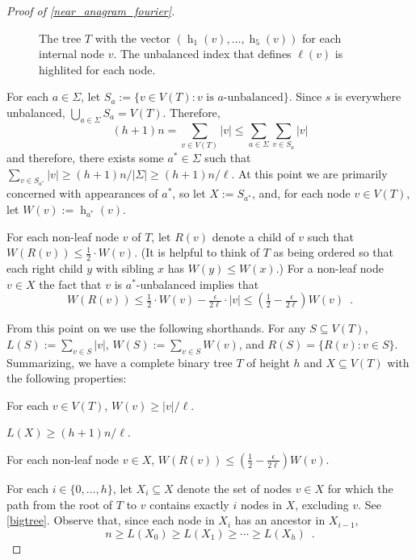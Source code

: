\documentclass{patmorin}
\DeclareMathOperator{\hist}{h}
\begin{document}
\begin{proof}[Proof of \cref{near_anagram_fourier}]
  \begin{figure}
    \caption{The tree $T$ with the vector $(\hist_1(v),\ldots,\hist_5(v))$ for each
     internal node $v$.  The unbalanced index that defines $\ell(v)$ is highlited for each node.}
    \label{binary_tree_2}
  \end{figure}

  For each $a\in\Sigma$, let $S_a:=\{v\in V(T): \text{$v$ is $a$-unbalanced}\}$. Since $s$ is everywhere unbalanced, $\bigcup_{a\in\Sigma} S_a=V(T)$. Therefore,
  \[
     (h+1)n = \sum_{v\in V(T)}|v|\le \sum_{a\in\Sigma} \sum_{v\in S_a} |v|
  \]
  and therefore, there exists some $a^*\in\Sigma$ such that $\sum_{v\in S_{a^*}}|v|\ge (h+1)n/|\Sigma| \ge (h+1)n/\ell$.   At this point we are primarily concerned with appearances of $a^*$, so let $X:=S_{a^*}$, and, for each node $v\in V(T)$, let $W(v):=\hist_{a^*}(v)$.

  For each non-leaf node $v$ of $T$, let $R(v)$ denote a child of $v$ such that $W(R(v))\le \tfrac12\cdot W(v)$.  (It is helpful to think of $T$ as being ordered so that each right child $y$ with sibling $x$ has $W(y)\le W(x)$.)  For a non-leaf node $v\in X$ the fact that $v$ is $a^*$-unbalanced implies that
  \[  W(R(v)) \le \tfrac{1}{2}\cdot W(v) - \tfrac{\epsilon}{2\ell}\cdot |v|
      \le (\tfrac12-\tfrac{\epsilon}{2\ell})W(v) \enspace .
  \]

  From this point on we use the following shorthands. For any $S\subseteq V(T)$, $L(S):=\sum_{v\in S}|v|$, $W(S):=\sum_{v\in S}W(v)$, and $R(S)=\{R(v):v\in S\}$.  Summarizing, we have a complete binary tree $T$ of height $h$ and
  $X\subseteq V(T)$ with the following properties:
  \begin{compactenum}
    \item For each $v\in V(T)$,  $W(v)\ge |v|/\ell$.
    \item $L(X) \ge (h+1)n/\ell$.
    \item For each non-leaf node $v\in X$,
      $W(R(v)) \le (\tfrac{1}{2}-\tfrac{\epsilon}{2\ell})W(v)$.
  \end{compactenum}
  For each $i\in\{0,\ldots,h\}$, let $X_i\subseteq X$ denote the
  set of nodes $v\in X$ for which the path from the root of $T$ to $v$
  contains exactly $i$ nodes in $X$, excluding $v$.  See \cref{bigtree}. Observe that, since each node in $X_i$ has an ancestor in $X_{i-1}$,
  \[  n \ge L(X_0) \ge L(X_1) \ge \cdots\ge L(X_{h}) \enspace . \]


\end{proof}
\end{document}
